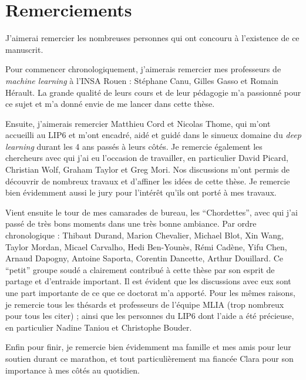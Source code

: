 

\cleardoublepage
\chapter{Remerciements}


J'aimerai remercier les nombreuses personnes qui ont concouru à l'existence de ce manuscrit.

Pour commencer chronologiquement, j'aimerais remercier mes professeurs de \textit{machine learning} à l'INSA Rouen : Stéphane Canu, Gilles Gasso et Romain Hérault. La grande qualité de leurs cours et de leur pédagogie m'a passionné pour ce sujet et m'a donné envie de me lancer dans cette thèse.

Ensuite, j'aimerais remercier Matthieu Cord et Nicolas Thome, qui m'ont accueilli au LIP6 et m'ont encadré, aidé et guidé dans le sinueux domaine du \textit{deep learning} durant les 4 ans passés à leurs côtés. Je remercie également les chercheurs avec qui j’ai eu l’occasion de travailler, en particulier David Picard, Christian Wolf, Graham Taylor et Greg Mori. Nos discussions m'ont permis de découvrir de nombreux travaux et d'affiner les idées de cette thèse. Je remercie bien évidemment aussi le jury pour l'intérêt qu'ils ont porté à mes travaux.

Vient ensuite le tour de mes camarades de bureau, les ``Chordettes'', avec qui j’ai passé de très bons moments dans une très bonne ambiance. Par ordre chronologique : Thibaut Durand, Marion Chevalier, Michael Blot, Xin Wang, Taylor Mordan, Micael Carvalho, Hedi Ben-Younès, Rémi Cadène, Yifu Chen, Arnaud Dapogny, Antoine Saporta, Corentin Dancette, Arthur Douillard. Ce ``petit'' groupe soudé a clairement contribué à cette thèse par son esprit de partage et d'entraide important. Il est évident que les discussions avec eux sont une part importante de ce que ce doctorat m'a apporté. Pour les mêmes raisons, je remercie tous les thésards et professeurs de l'équipe MLIA (trop nombreux pour tous les citer) ; ainsi que les personnes du LIP6 dont l'aide a été précieuse, en particulier Nadine Taniou et Christophe Bouder.

Enfin pour finir, je remercie bien évidemment ma famille et mes amis pour leur soutien durant ce marathon, et tout particulièrement ma fiancée Clara pour son importance à mes côtés au quotidien.


